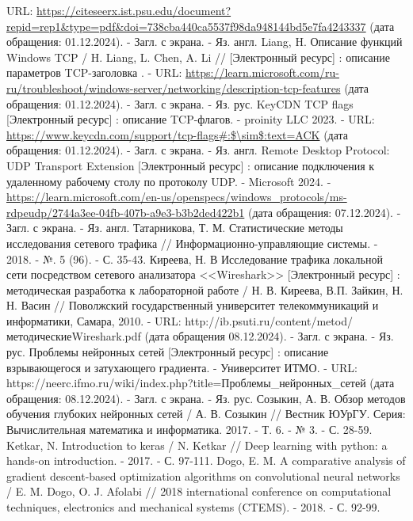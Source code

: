 \documentclass[spec, och, diploma]{SCWorks}
\begin{document}
\begin{thebibliography}{25}
    URL: \url{https://citeseerx.ist.psu.edu/document?repid=rep1&type=pdf&doi=738cba440ca5537f98da948144bd5e7fa4243337} (дата обращения: 01.12.2024). - Загл. с экрана. - Яз. англ.
    Liang, H. Описание функций Windows TCP /  H. Liang, L. Chen, A. Li // [Электронный ресурс] : описание параметров TCP-заголовка . - URL: 
    \url{https://learn.microsoft.com/ru-ru/troubleshoot/windows-server/networking/description-tcp-features} (дата обращения: 01.12.2024). - Загл. с экрана. -  Яз. рус.
    KeyCDN TCP flags [Электронный ресурс] : описание TCP-флагов. - proinity LLC 2023. - URL: \url{https://www.keycdn.com/support/tcp-flags\#:$\sim$:text=ACK}
    (дата обращения: 01.12.2024). - Загл. с экрана. -  Яз. англ.
    Remote Desktop Protocol: UDP Transport Extension [Электронный ресурс] : описание подключения к удаленному рабочему столу по протоколу UDP. - Microsoft 2024. - 
    \url{https://learn.microsoft.com/en-us/openspecs/windows_protocols/ms-rdpeudp/2744a3ee-04fb-407b-a9e3-b3b2ded422b1} (дата обращения: 07.12.2024). - Загл. с экрана. -  Яз. англ.
    Татарникова, Т. М. Статистические методы исследования сетевого трафика // Информационно-управляющие системы. - 2018. - №. 5 (96). - С. 35-43.
    Киреева, Н. В Исследование трафика локальной сети посредством сетевого анализатора <<Wireshark>> [Электронный ресурс] : методическая разработка к лабораторной работе / Н. В. Киреева, В.П. Зайкин, Н. Н. Васин // Поволжский государственный университет телекоммуникаций и информатики, Самара, 2010. - URL: http://ib.psuti.ru/content/metod/методическиеWireshark.pdf (дата обращения 08.12.2024). - Загл. с экрана. - Яз. рус.
    Проблемы нейронных сетей [Электронный ресурс] : описание взрывающегося и затухающего градиента. - Университет ИТМО. - URL: https://neerc.ifmo.ru/wiki/index.php?title=Проблемы_нейронных_сетей (дата обращения: 08.12.2024). - Загл. с экрана. -  Яз. рус.
    Созыкин, А. В. Обзор методов обучения глубоких нейронных сетей / А. В. Созыкин // Вестник ЮУрГУ. Серия: Вычислительная математика и информатика. 2017. - Т. 6. - № 3. - С. 28-59.
    Ketkar, N. Introduction to keras / N. Ketkar // Deep learning with python: a hands-on introduction. - 2017. - С. 97-111.
    Dogo, E. M. A comparative analysis of gradient descent-based optimization algorithms on convolutional neural networks / E. M. Dogo, O. J. Afolabi // 
    2018 international conference on computational techniques, electronics and mechanical systems (CTEMS). - 2018. - С. 92-99.

\end{thebibliography}
\end{document}
